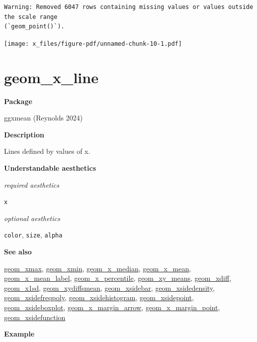 \documentclass[
  letterpaper,
  DIV=11,
  numbers=noendperiod]{scrreprt}
\begin{document}
\begin{verbatim}
Warning: Removed 6047 rows containing missing values or values outside the scale range
(`geom_point()`).
\end{verbatim}

\texttt{[image: x\_files/figure-pdf/unnamed-chunk-10-1.pdf]}

\section{geom\_x\_line}\label{x_line}

\textbf{Package}

ggxmean (Reynolds 2024)

\textbf{Description}

Lines defined by values of x.

\textbf{Understandable aesthetics}

\emph{required aesthetics}

\texttt{x}

\emph{optional aesthetics}

\texttt{color}, \texttt{size}, \texttt{alpha}

\textbf{See also}

\href{@xmax}{geom\_xmax}, \href{@xmin}{geom\_xmin},
\href{@x_median}{geom\_x\_median}, \href{@x_mean}{geom\_x\_mean},
\href{@x_mean_label}{geom\_x\_mean\_label},
\href{@x_percentile}{geom\_x\_percentile},
\href{@xy_means}{geom\_xy\_means}, \href{@xdiff}{geom\_xdiff},
\href{@x1sd}{geom\_x1sd}, \href{@xydiffsmean}{geom\_xydiffsmean},
\href{@xsidebar}{geom\_xsidebar},
\href{@xsidedensity}{geom\_xsidedensity},
\href{@xsidefreqpoly}{geom\_xsidefreqpoly},
\href{@xsidehistogram}{geom\_xsidehistogram},
\href{@xsidepoint}{geom\_xsidepoint},
\href{@xsideboxplot}{geom\_xsideboxplot},
\href{@x_margin_arrow}{geom\_x\_margin\_arrow},
\href{@x_margin_point}{geom\_x\_margin\_point},
\href{@xsidefunction}{geom\_xsidefunction}

\textbf{Example }
\end{document}
